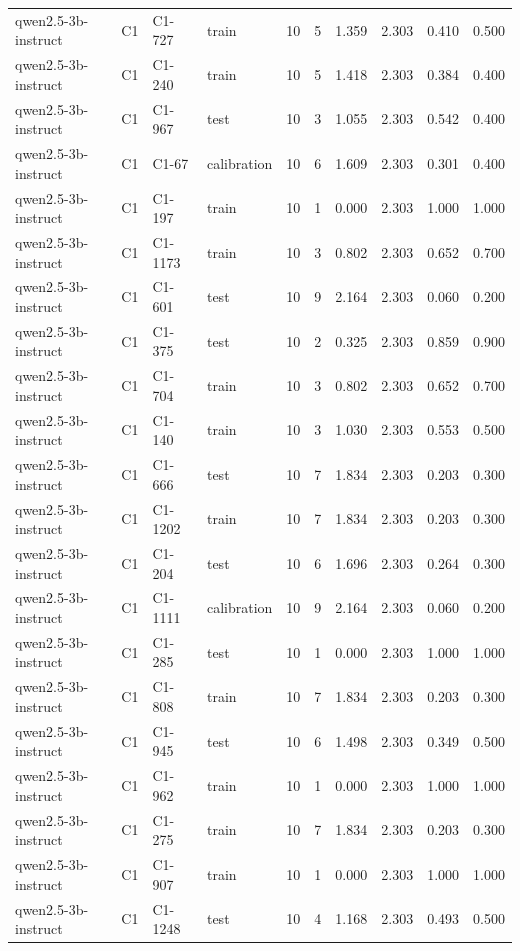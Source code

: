 \begin{table}
\begin{tabular}{llllrrrrrr}
qwen2.5-3b-instruct & C1 & C1-727 & train & 10 & 5 & 1.359 & 2.303 & 0.410 & 0.500 \\
qwen2.5-3b-instruct & C1 & C1-240 & train & 10 & 5 & 1.418 & 2.303 & 0.384 & 0.400 \\
qwen2.5-3b-instruct & C1 & C1-967 & test & 10 & 3 & 1.055 & 2.303 & 0.542 & 0.400 \\
qwen2.5-3b-instruct & C1 & C1-67 & calibration & 10 & 6 & 1.609 & 2.303 & 0.301 & 0.400 \\
qwen2.5-3b-instruct & C1 & C1-197 & train & 10 & 1 & 0.000 & 2.303 & 1.000 & 1.000 \\
qwen2.5-3b-instruct & C1 & C1-1173 & train & 10 & 3 & 0.802 & 2.303 & 0.652 & 0.700 \\
qwen2.5-3b-instruct & C1 & C1-601 & test & 10 & 9 & 2.164 & 2.303 & 0.060 & 0.200 \\
qwen2.5-3b-instruct & C1 & C1-375 & test & 10 & 2 & 0.325 & 2.303 & 0.859 & 0.900 \\
qwen2.5-3b-instruct & C1 & C1-704 & train & 10 & 3 & 0.802 & 2.303 & 0.652 & 0.700 \\
qwen2.5-3b-instruct & C1 & C1-140 & train & 10 & 3 & 1.030 & 2.303 & 0.553 & 0.500 \\
qwen2.5-3b-instruct & C1 & C1-666 & test & 10 & 7 & 1.834 & 2.303 & 0.203 & 0.300 \\
qwen2.5-3b-instruct & C1 & C1-1202 & train & 10 & 7 & 1.834 & 2.303 & 0.203 & 0.300 \\
qwen2.5-3b-instruct & C1 & C1-204 & test & 10 & 6 & 1.696 & 2.303 & 0.264 & 0.300 \\
qwen2.5-3b-instruct & C1 & C1-1111 & calibration & 10 & 9 & 2.164 & 2.303 & 0.060 & 0.200 \\
qwen2.5-3b-instruct & C1 & C1-285 & test & 10 & 1 & 0.000 & 2.303 & 1.000 & 1.000 \\
qwen2.5-3b-instruct & C1 & C1-808 & train & 10 & 7 & 1.834 & 2.303 & 0.203 & 0.300 \\
qwen2.5-3b-instruct & C1 & C1-945 & test & 10 & 6 & 1.498 & 2.303 & 0.349 & 0.500 \\
qwen2.5-3b-instruct & C1 & C1-962 & train & 10 & 1 & 0.000 & 2.303 & 1.000 & 1.000 \\
qwen2.5-3b-instruct & C1 & C1-275 & train & 10 & 7 & 1.834 & 2.303 & 0.203 & 0.300 \\
qwen2.5-3b-instruct & C1 & C1-907 & train & 10 & 1 & 0.000 & 2.303 & 1.000 & 1.000 \\
qwen2.5-3b-instruct & C1 & C1-1248 & test & 10 & 4 & 1.168 & 2.303 & 0.493 & 0.500 \\

\end{tabular}
\end{table}
